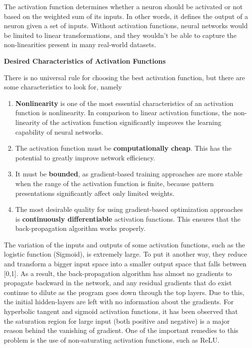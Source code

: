 \documentclass{article}
\begin{document}
The activation function determines whether a neuron should be activated or not based on the weighted sum of its inputs. In other words, it defines the output of a neuron given a set of inputs. Without activation functions, neural networks would be limited to linear transformations, and they wouldn't be able to capture the non-linearities present in many real-world datasets. 

\vspace{5mm}
\noindent \textbf{Desired Characteristics of Activation Functions} \citep{jagtap2022important}

\noindent There is no universal rule for choosing the best activation function, but there are some characteristics to look for, namely
\begin{enumerate}
  \item \textbf{Nonlinearity} is one of the most essential characteristics
of an activation function is nonlinearity. In comparison
to linear activation functions, the non-linearity of the
activation function significantly improves the learning
capability of neural networks. 
\item The activation function must
  be \textbf{computationally cheap}. This has
the potential to greatly improve network efficiency.
  \item It must be \textbf{bounded}, as gradient-based training approaches are more stable when the range of the activation function is finite, because pattern presentations
significantly affect only limited weights. 
\item The most desirable quality for using
gradient-based optimization approaches is \textbf{continuously
  differentiable} activation functions. This ensures that the
back-propagation algorithm works properly. 
\end{enumerate}
\begin{remark} The variation
of the inputs and outputs of some activation functions,
such as the logistic function (Sigmoid), is extremely
large. To put it another way, they reduce and transform
a bigger input space into a smaller output space that
falls between [0,1]. As a result, the back-propagation
algorithm has almost no gradients to propagate backward
in the network, and any residual gradients that do exist
continue to dilute as the program goes down through the
top layers. Due to this, the initial hidden-layers are left
with no information about the gradients. For hyperbolic
tangent and sigmoid activation functions, it has been
observed that the saturation region for large input (both
positive and negative) is a major reason behind the
vanishing of gradient. One of the important remedies
to this problem is the use of non-saturating activation
functions, such as ReLU.
\end{remark}
\end{document}

